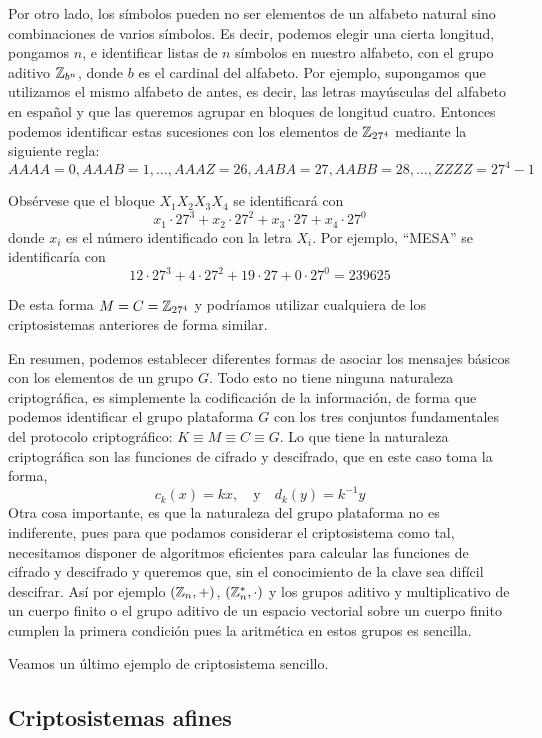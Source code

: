 Por otro lado, los símbolos pueden no ser elementos de un alfabeto natural sino combinaciones de varios símbolos. Es decir, podemos elegir una cierta longitud, pongamos $n$, e identificar listas de $n$ símbolos en nuestro alfabeto, con el grupo aditivo $\mathbb{Z}_{b^n}$, donde $b$ es el cardinal del alfabeto. Por ejemplo, supongamos que utilizamos el mismo alfabeto de antes, es decir, las letras mayúsculas del alfabeto en español y que las queremos agrupar en bloques de longitud cuatro. Entonces podemos identificar estas sucesiones con los elementos de $\mathbb{Z}_{27^4}$ mediante la siguiente regla:
$$AAAA=0, AAAB=1, \dots, AAAZ=26,AABA=27,AABB=28,\dots,ZZZZ=27^4-1$$

Obsérvese que el bloque $X_1X_2X_3X_4$ se identificará con 
$$x_1\cdot 27^3+x_2\cdot 27^2+x_3\cdot 27+x_4\cdot 27^0$$
donde $x_i$ es el número identificado con la letra $X_i$. Por ejemplo, ``MESA'' se identificaría con
$$12\cdot 27^3+4\cdot 27^2+19\cdot 27+0\cdot 27^0=239625$$

De esta forma $M=C=\mathbb{Z}_{27^4}$ y podríamos utilizar cualquiera de los criptosistemas anteriores de forma similar.

En resumen, podemos establecer diferentes formas de asociar los mensajes básicos con los elementos de un grupo $G$. Todo esto no tiene ninguna naturaleza criptográfica, es simplemente la codificación de la información, de forma que podemos identificar el grupo plataforma $G$ con los tres conjuntos fundamentales del protocolo criptográfico: $K\equiv M\equiv C\equiv G$. Lo que tiene la naturaleza criptográfica son las funciones de cifrado y descifrado, que en este caso toma la forma,
$$c_k(x)=kx, \quad\text{y}\quad d_k(y)=k^{-1}y$$
Otra cosa importante, es que la naturaleza del grupo plataforma no es indiferente, pues para que podamos considerar el criptosistema como tal, necesitamos disponer de algoritmos eficientes para calcular las funciones de cifrado y descifrado y queremos que, sin el conocimiento de la clave sea difícil descifrar. Así por ejemplo $(\mathbb{Z}_n,+)$, $(\mathbb{Z}^*_n,\cdot)$ y los grupos aditivo y multiplicativo de un cuerpo finito o el grupo aditivo de un espacio vectorial sobre un cuerpo finito cumplen la primera condición pues la aritmética en estos grupos es sencilla.

Veamos un último ejemplo de criptosistema sencillo.

\subsection*{Criptosistemas afines}

